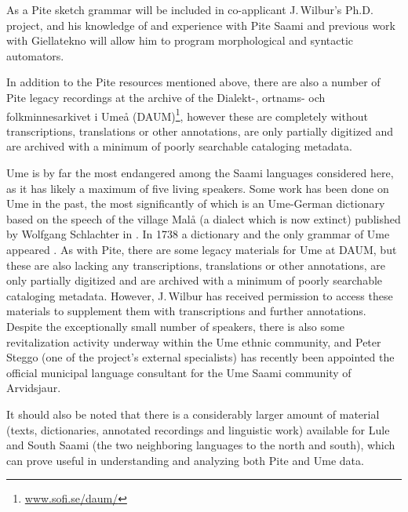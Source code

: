 \documentclass[a4paper,12pt]{article}
\begin{document}
As a Pite sketch grammar will be included in co-applicant J.\,Wilbur's Ph.D. project, and his knowledge of and experience with Pite Saami and previous work with Giellatekno will allow him to program morphological and syntactic automators.

In addition to the Pite resources mentioned above, there are also a number of Pite legacy recordings at the archive of the Dialekt-, ortnams- och folkminnesarkivet i Umeå (DAUM)\footnote{\url{www.sofi.se/daum/}}, however these are completely without transcriptions, translations or other annotations, are only partially digitized and are archived with a minimum of poorly searchable cataloging metadata.

Ume is by far the most endangered among the Saami languages considered here, as it has likely a maximum of five living speakers. Some work has been done on Ume in the past, the most significantly of which is an Ume-German dictionary based on the speech of the village Malå (a dialect which is now extinct) published by Wolfgang Schlachter in \citeyear{schlachter1958}. In 1738 a dictionary and the only grammar of Ume appeared \cite{fjellstrom1738a,fjellstrom1738b}.
As with Pite, there are some legacy materials for Ume at DAUM, but these are also lacking any transcriptions, translations or other annotations, are only partially digitized and are archived with a minimum of poorly searchable cataloging metadata. However, J.\,Wilbur has received permission to access these materials to supplement them with transcriptions and further annotations.
Despite the exceptionally small number of speakers, there is also some revitalization activity underway within the Ume ethnic community, and Peter Steggo (one of the project's external specialists) has recently been appointed the official municipal language consultant for the Ume Saami community of Arvidsjaur.

It should also be noted that there is a considerably larger amount of material (texts, dictionaries, annotated recordings and linguistic work)  available for Lule and South Saami (the two neighboring languages to the north and south), which can prove useful in understanding and analyzing both Pite and Ume data.
\end{document}

